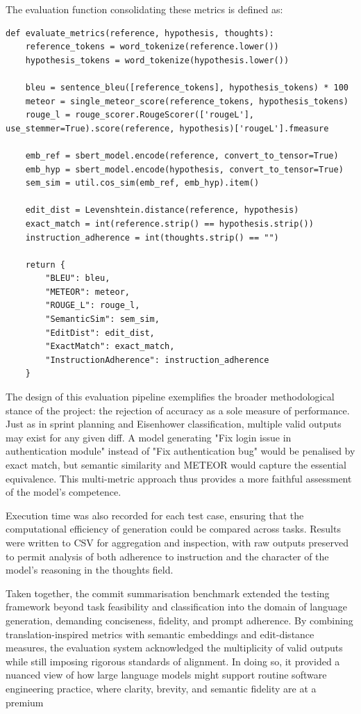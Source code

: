 \documentclass{report}
\begin{document}
The evaluation function consolidating these metrics is defined as:

\begin{lstlisting}[style=pythonstyle]
def evaluate_metrics(reference, hypothesis, thoughts):
    reference_tokens = word_tokenize(reference.lower())
    hypothesis_tokens = word_tokenize(hypothesis.lower())

    bleu = sentence_bleu([reference_tokens], hypothesis_tokens) * 100
    meteor = single_meteor_score(reference_tokens, hypothesis_tokens)
    rouge_l = rouge_scorer.RougeScorer(['rougeL'], use_stemmer=True).score(reference, hypothesis)['rougeL'].fmeasure

    emb_ref = sbert_model.encode(reference, convert_to_tensor=True)
    emb_hyp = sbert_model.encode(hypothesis, convert_to_tensor=True)
    sem_sim = util.cos_sim(emb_ref, emb_hyp).item()

    edit_dist = Levenshtein.distance(reference, hypothesis)
    exact_match = int(reference.strip() == hypothesis.strip())
    instruction_adherence = int(thoughts.strip() == "")

    return {
        "BLEU": bleu,
        "METEOR": meteor,
        "ROUGE_L": rouge_l,
        "SemanticSim": sem_sim,
        "EditDist": edit_dist,
        "ExactMatch": exact_match,
        "InstructionAdherence": instruction_adherence
    }

\end{lstlisting}

The design of this evaluation pipeline exemplifies the broader methodological stance of the project: the rejection of accuracy as a sole measure of performance. 
Just as in sprint planning and Eisenhower classification, multiple valid outputs may exist for any given diff. 
A model generating "Fix login issue in authentication module" instead of "Fix authentication bug" would be penalised by exact match, but semantic similarity and METEOR would capture the essential equivalence. 
This multi-metric approach thus provides a more faithful assessment of the model's competence.

Execution time was also recorded for each test case, ensuring that the computational efficiency of generation could be compared across tasks. 
Results were written to CSV for aggregation and inspection, with raw outputs preserved to permit analysis of both adherence to instruction and the character of the model's reasoning in the thoughts field.

Taken together, the commit summarisation benchmark extended the testing framework beyond task feasibility and classification into the domain of language generation, demanding conciseness, fidelity, and prompt adherence. 
By combining translation-inspired metrics with semantic embeddings and edit-distance measures, the evaluation system acknowledged the multiplicity of valid outputs while still imposing rigorous standards of alignment. 
In doing so, it provided a nuanced view of how large language models might support routine software engineering practice, where clarity, brevity, and semantic fidelity are at a premium
\end{document}
